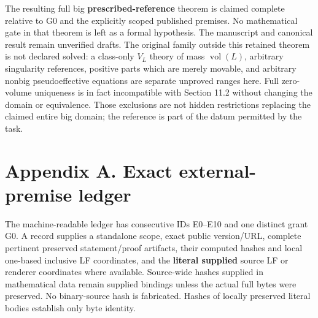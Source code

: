 \documentclass[
  10pt,
]{article}
\begin{document}
The resulting full big \textbf{prescribed-reference} theorem is claimed
complete relative to G0 and the explicitly scoped published premises. No
mathematical gate in that theorem is left as a formal hypothesis. The
manuscript and canonical result remain unverified drafts. The original
family outside this retained theorem is not declared solved: a
class-only \(V_L\) theory of mass \(\operatorname{vol}(L)\), arbitrary
singularity references, positive parts which are merely movable, and
arbitrary nonbig pseudoeffective equations are separate unproved ranges
here. Full zero-volume uniqueness is in fact incompatible with Section
11.2 without changing the domain or equivalence. Those exclusions are
not hidden restrictions replacing the claimed entire big domain; the
reference is part of the datum permitted by the task.

\section{Appendix A. Exact external-premise
ledger}\label{appendix-a.-exact-external-premise-ledger}

The machine-readable ledger has consecutive IDs E0--E10 and one distinct
grant G0. A record supplies a standalone scope, exact public
version/URL, complete pertinent preserved statement/proof artifacts,
their computed hashes and local one-based inclusive LF coordinates, and
the \textbf{literal supplied} source LF or renderer coordinates where
available. Source-wide hashes supplied in mathematical data remain
supplied bindings unless the actual full bytes were preserved. No
binary-source hash is fabricated. Hashes of locally preserved literal
bodies establish only byte identity.
\end{document}
